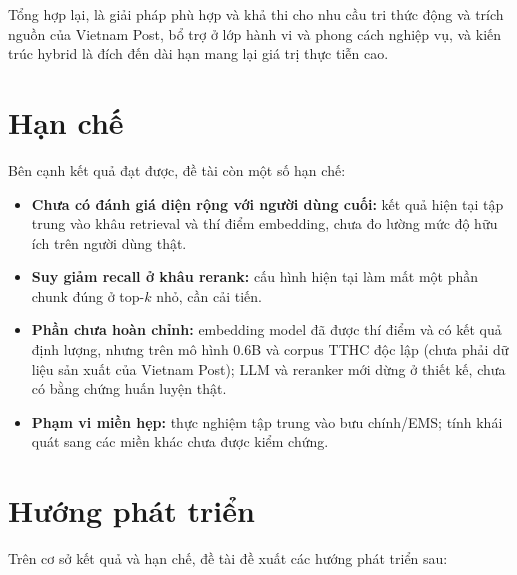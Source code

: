 Tổng hợp lại, \rag{} là giải pháp phù hợp và khả thi cho nhu cầu tri thức động và trích
nguồn của Vietnam Post, \ft{} bổ trợ ở lớp hành vi và phong cách nghiệp vụ, và kiến trúc hybrid là
đích đến dài hạn mang lại giá trị thực tiễn cao.

\section{Hạn chế}

Bên cạnh kết quả đạt được, đề tài còn một số hạn chế:

\begin{itemize}
  \item \textbf{Chưa có đánh giá diện rộng với người dùng cuối:} kết quả hiện tại tập trung
  vào khâu retrieval và thí điểm embedding, chưa đo lường mức độ hữu ích trên người dùng thật.
  \item \textbf{Suy giảm recall ở khâu rerank:} cấu hình hiện tại làm mất một phần
  chunk đúng ở top-$k$ nhỏ, cần cải tiến.
  \item \textbf{Phần \ft{} chưa hoàn chỉnh:} embedding model đã được thí điểm và có kết quả
  định lượng, nhưng trên mô hình 0.6B và corpus TTHC độc lập (chưa phải dữ liệu sản xuất của
  Vietnam Post); LLM và reranker mới dừng ở thiết kế, chưa có bằng chứng huấn luyện thật.
  \item \textbf{Phạm vi miền hẹp:} thực nghiệm tập trung vào bưu chính/EMS; tính khái quát
  sang các miền khác chưa được kiểm chứng.
\end{itemize}

\section{Hướng phát triển}

Trên cơ sở kết quả và hạn chế, đề tài đề xuất các hướng phát triển sau:

